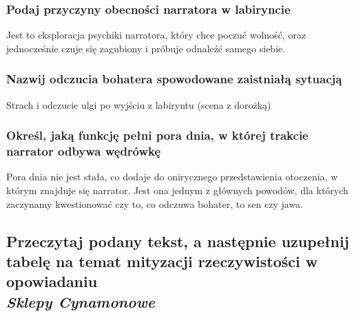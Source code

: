 \documentclass[a4paper]{article}
\begin{document}
\subsubsection{Podaj przyczyny obecności narratora w labiryncie}
Jest to eksploracja psychiki narratora, który chce poczuć wolność, oraz jednocześnie czuje się zagubiony i próbuje odnaleźć samego siebie.
\subsubsection{Nazwij odczucia bohatera spowodowane zaistniałą sytuacją}
Strach i odczucie ulgi po wyjściu z labiryntu (scena z dorożką)
\subsubsection{Określ, jaką funkcję pełni pora dnia, w której trakcie narrator odbywa wędrówkę}
Pora dnia nie jest stała, co dodaje do onirycznego przedstawienia otoczenia, w którym znajduje się narrator. Jest ona jednym z głównych powodów, dla których zaczynamy kwestionować czy to, co odczuwa bohater, to sen czy jawa.
\subsection{Przeczytaj podany tekst, a następnie uzupełnij tabelę na temat mityzacji rzeczywistości w opowiadaniu \\\emph{Sklepy Cynamonowe}}
\end{document}
